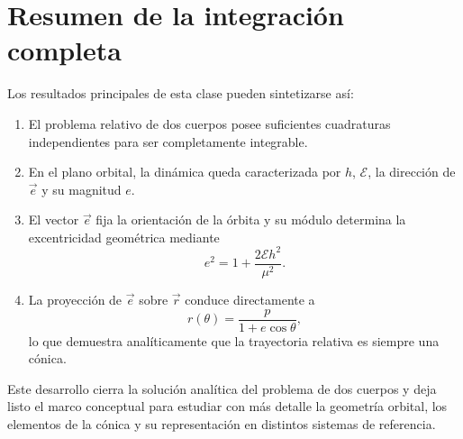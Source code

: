 \section{Resumen de la integración completa}
Los resultados principales de esta clase pueden sintetizarse así:
\begin{enumerate}
    \item El problema relativo de dos cuerpos posee suficientes cuadraturas independientes para ser completamente integrable.
    \item En el plano orbital, la dinámica queda caracterizada por \(h\), \(\mathcal{E}\), la dirección de \(\vec{e}\) y su magnitud \(e\).
    \item El vector \(\vec{e}\) fija la orientación de la órbita y su módulo determina la excentricidad geométrica mediante
\[
 e^2 = 1 + \frac{2\mathcal{E}h^2}{\mu^2}.
\]
    \item La proyección de \(\vec{e}\) sobre \(\vec{r}\) conduce directamente a
\[
 r(\theta) = \frac{p}{1 + e\cos\theta},
\]
lo que demuestra analíticamente que la trayectoria relativa es siempre una cónica.
\end{enumerate}

Este desarrollo cierra la solución analítica del problema de dos cuerpos y deja listo el marco conceptual para estudiar con más detalle la geometría orbital, los elementos de la cónica y su representación en distintos sistemas de referencia.